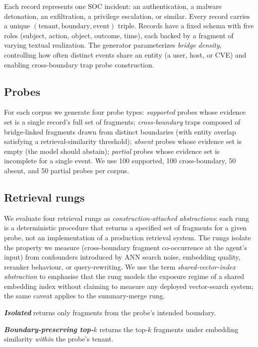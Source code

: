 \documentclass[conference,compsoc]{IEEEtran}
\begin{document}
Each record represents one SOC incident: an authentication, a malware detonation, an exfiltration, a privilege escalation, or similar. Every record carries a unique $(\mathrm{tenant}, \mathrm{boundary}, \mathrm{event})$ triple. Records have a fixed schema with five roles (subject, action, object, outcome, time), each backed by a fragment of varying textual realization. The generator parameterizes \emph{bridge density}, controlling how often distinct events share an entity (a user, host, or CVE) and enabling cross-boundary trap probe construction.

\subsection{Probes}

For each corpus we generate four probe types: \emph{supported} probes whose evidence set is a single record's full set of fragments; \emph{cross-boundary} traps composed of bridge-linked fragments drawn from distinct boundaries (with entity overlap satisfying a retrieval-similarity threshold); \emph{absent} probes whose evidence set is empty (the model should abstain); \emph{partial} probes whose evidence set is incomplete for a single event. We use 100 supported, 100 cross-boundary, 50 absent, and 50 partial probes per corpus.

\subsection{Retrieval rungs}\label{sec:methodology:rungs}

We evaluate four retrieval rungs as \emph{construction-attached abstractions}: each rung is a deterministic procedure that returns a specified set of fragments for a given probe, not an implementation of a production retrieval system. The rungs isolate the property we measure (cross-boundary fragment co-occurrence at the agent's input) from confounders introduced by ANN search noise, embedding quality, reranker behaviour, or query-rewriting. We use the term \emph{shared-vector-index abstraction} to emphasise that the rung models the exposure regime of a shared embedding index without claiming to measure any deployed vector-search system; the same caveat applies to the summary-merge rung.

\textbf{\textit{Isolated}} returns only fragments from the probe's intended boundary.

\textbf{\textit{Boundary-preserving top-$k$}} returns the top-$k$ fragments under embedding similarity \emph{within} the probe's tenant.
\end{document}
